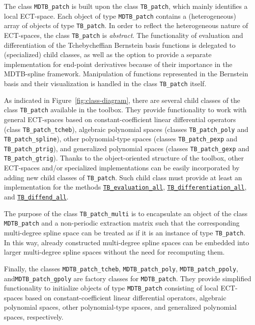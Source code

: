 \documentclass[10pt]{acmtrans2e}
\begin{document}
The class \texttt{MDTB\_patch} is built upon the class \texttt{TB\_patch}, which mainly identifies a local ECT-space. Each object of type \texttt{MDTB\_patch} contains a (heterogeneous) array of objects of type \texttt{TB\_patch}. In order to reflect the heterogeneous nature of ECT-spaces, the class \texttt{TB\_patch} is \emph{abstract}. The functionality of evaluation and differentiation of the Tchebycheffian Bernstein basis functions is delegated to (specialized) child classes, as well as the option to provide a separate implementation for end-point derivatives because of their importance in the MDTB-spline framework. Manipulation of functions represented in the Bernstein basis and their visualization is handled in the class \texttt{TB\_patch} itself.

As indicated in Figure~\ref{fig:class-diagram}, there are several child classes of the class \texttt{TB\_patch} available in the toolbox. They provide functionality to work with general ECT-spaces based on constant-coefficient linear differential operators (class \texttt{TB\_patch\_tcheb}), algebraic polynomial spaces (classes \texttt{TB\_patch\_poly} and \texttt{TB\_patch\_spline}), other polynomial-type spaces (classes \texttt{TB\_patch\_pexp} and \texttt{TB\_patch\_ptrig}), and generalized polynomial spaces (classes \texttt{TB\_patch\_gexp} and \texttt{TB\_patch\_gtrig}). Thanks to the object-oriented structure of the toolbox, other ECT-spaces and/or specialized implementations can be easily incorporated by adding new child classes of \texttt{TB\_patch}. Such child class must provide at least an implementation for the methods \hyperref[sec:matlab-tb-evaluation-all]{\texttt{TB\_evaluation\_all}}, \hyperref[sec:matlab-tb-differentiation-all]{\texttt{TB\_differentiation\_all}}, and \hyperref[sec:matlab-tb-diffend-all]{\texttt{TB\_diffend\_all}}.

The purpose of the class \texttt{TB\_patch\_multi} is to encapsulate an object of the class \texttt{MDTB\_patch} and a non-periodic extraction matrix such that the corresponding multi-degree spline space can be treated as if it is an instance of type \texttt{TB\_patch}. In this way, already constructed multi-degree spline spaces can be embedded into larger multi-degree spline spaces without the need for recomputing them.

Finally, the classes \texttt{MDTB\_patch\_tcheb}, \texttt{MDTB\_patch\_poly}, \texttt{MDTB\_patch\_ppoly}, and\linebreak \texttt{MDTB\_patch\_gpoly} are factory classes for \texttt{MDTB\_patch}. They provide simplified functionality to initialize objects of type \texttt{MDTB\_patch} consisting of local ECT-spaces based on constant-coefficient linear differential operators, algebraic polynomial spaces, other polynomial-type spaces, and generalized polynomial spaces, respectively.
\end{document}
